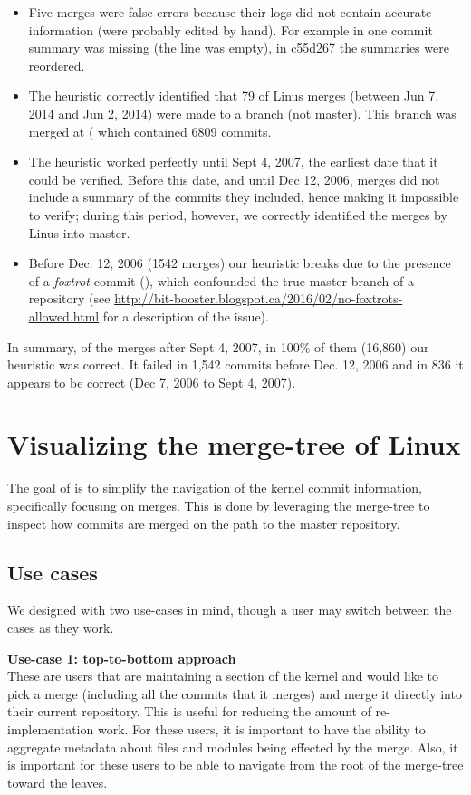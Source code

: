 \documentclass[conference, draftclsnofoot, draft]{IEEEtran}
\begin{document}
\begin{itemize}
\item Five merges were false-errors because their logs did not contain accurate information (were probably edited by
  hand). For example in  one commit summary was missing (the line was empty), in \mycode
  {c55d267} the summaries were reordered.
\item The heuristic correctly identified that 79 of Linus merges (between Jun 7, 2014 and Jun 2, 2014) were made to a
  branch (not master). This branch was merged at ( which contained 6809 commits.
\item The heuristic worked perfectly until Sept 4, 2007, the earliest date that it could be verified.
  Before this date, and until Dec 12, 2006, merges did not include a summary of the commits they included, hence making it
  impossible to verify; during this period, however, we correctly identified the merges by Linus into master.
\item Before Dec. 12, 2006 (1542 merges) our heuristic breaks due to the
presence of a \textit{foxtrot} commit (), which confounded the true master branch of a
repository (see \url{http://bit-booster.blogspot.ca/2016/02/no-foxtrots-allowed.html} for a description of the issue).
\end{itemize}

In summary, of the merges after Sept 4, 2007, in 100\% of them (16,860) our heuristic was correct. It failed in 1,542
commits before Dec. 12, 2006 and in 836 it appears to be correct (Dec 7, 2006 to Sept 4, 2007).

\section{Visualizing the merge-tree of Linux}

The goal of \tool is to simplify the navigation of the kernel commit information,
specifically focusing on merges. This is done by leveraging the merge-tree to
inspect how commits are merged on the path to the master repository.

\subsection{Use cases}

We designed \tool with two use-cases in mind, though a user may switch between the
cases as they work.

\noindent \textbf{Use-case 1: top-to-bottom approach}\label{sec:usecase1}\\ These
are users that are maintaining a section of the kernel and would like to pick a
merge (including all the commits that it merges) and merge it directly into their
current repository. This is useful for reducing the amount of re-implementation
work. For these users, it is important to have the ability to aggregate metadata
about files and modules being effected by the merge. Also, it is important for these
users to be able to navigate from the root of the merge-tree toward the leaves.
\end{document}
